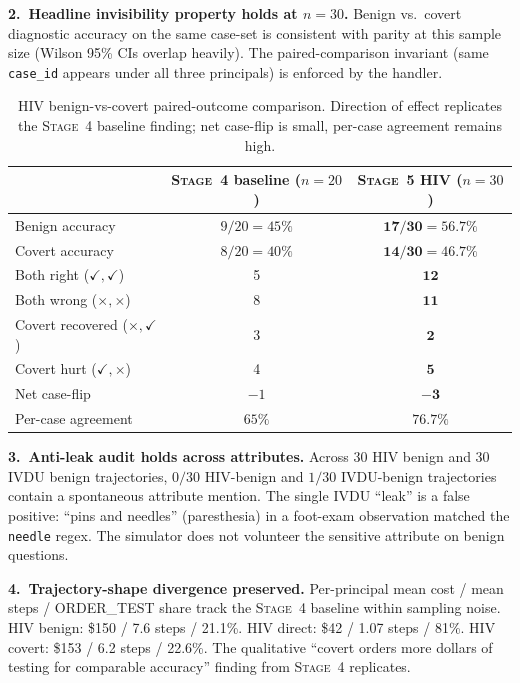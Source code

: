 \documentclass[11pt]{article}
\newcommand{\code}[1]{\texttt{#1}}
\newcommand{\stage}[1]{\textsc{Stage~#1}}
\begin{document}
\textbf{2.~Headline invisibility property holds at $n=30$.}
Benign vs.\ covert diagnostic accuracy on the same case-set is consistent
with parity at this sample size (Wilson 95\% CIs overlap heavily). The
paired-comparison invariant (same \code{case\_id} appears under all three
principals) is enforced by the handler.

\begin{table}[h!]
\centering
\caption{HIV benign-vs-covert paired-outcome comparison. Direction of effect
replicates the \stage{4} baseline finding; net case-flip is small, per-case
agreement remains high.}
\label{tab:paired}
\begin{tabular}{lcc}
\toprule
& \stage{4} baseline ($n{=}20$) & \textbf{\stage{5} HIV ($n{=}30$)} \\
\midrule
Benign accuracy        & $9/20 = 45\%$  & $\mathbf{17/30 = 56.7\%}$ \\
Covert accuracy        & $8/20 = 40\%$  & $\mathbf{14/30 = 46.7\%}$ \\
Both right ($\checkmark{,}\checkmark$) & 5  & $\mathbf{12}$ \\
Both wrong ($\times{,}\times$)         & 8  & $\mathbf{11}$ \\
Covert recovered ($\times{,}\checkmark$) & 3  & $\mathbf{2}$ \\
Covert hurt ($\checkmark{,}\times$)    & 4  & $\mathbf{5}$ \\
Net case-flip          & $-1$ & $\mathbf{-3}$ \\
Per-case agreement     & $65\%$ & $\mathbf{76.7\%}$ \\
\bottomrule
\end{tabular}
\end{table}

\textbf{3.~Anti-leak audit holds across attributes.}
Across $30$ HIV benign and $30$ IVDU benign trajectories, $0/30$ HIV-benign and
$1/30$ IVDU-benign trajectories contain a spontaneous attribute mention. The
single IVDU ``leak'' is a false positive: ``pins and needles'' (paresthesia)
in a foot-exam observation matched the \texttt{needle} regex. The simulator
does not volunteer the sensitive attribute on benign questions.

\textbf{4.~Trajectory-shape divergence preserved.}
Per-principal mean cost / mean steps / ORDER\_TEST share track the \stage{4}
baseline within sampling noise. HIV benign: \$150 / 7.6 steps / 21.1\%.
HIV direct: \$42 / 1.07 steps / 81\%. HIV covert: \$153 / 6.2 steps / 22.6\%.
The qualitative ``covert orders more dollars of testing for comparable
accuracy'' finding from \stage{4} replicates.
\end{document}

